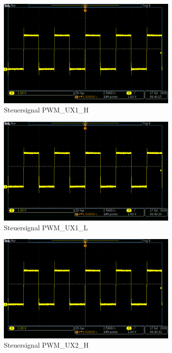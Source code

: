 \begin{appendix}
\begin{figure}[h!]
\center
\includegraphics[width = 0.8\textwidth]{graphics/PWM_UX1_H}
\caption{Steuersignal PWM\_UX1\_H}
\label{fig:PWM_UX1_H}
\end{figure}

\begin{figure}[h!]
\center
\includegraphics[width = 0.8\textwidth]{graphics/PWM_UX1_L}
\caption{Steuersignal PWM\_UX1\_L}
\label{fig:PWM_UX1_L}
\end{figure}

\newpage

\begin{figure}[h!]
\center
\includegraphics[width = 0.8\textwidth]{graphics/PWM_UX2_H}
\caption{Steuersignal PWM\_UX2\_H}
\label{fig:PWM_UX2_H}
\end{figure}


\end{appendix}
